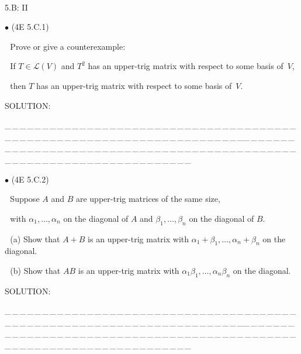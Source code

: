 \documentclass[a4paper, 11pt, UTF8]{article}
\def\Lm{\mathcal{L}}
\begin{document}
\begin{large}
\par{\tiny\,\par}

{\huge\timesbf 5.B: II}

{\small $\bullet$} (\normalsize{4E 5.C.1})\par\,\, {\timessl\Large 
Prove or give a counterexample:}\par\,\,
{\timessl\Large If $T\in \Lm(V)$ and $T^2$ has an upper-trig matrix with respect to some basis of \,$V$,}\par\,\,
{\timessl\Large then $T$ has an upper-trig matrix with respect to some basis of \,$V$.
}\par
{\timesbf S\footnotesize{OLUTION:}}\par\quad

\par
{\tiny \_\,\_\,\_\,\_\,\_\,\_\,\_\,\_\,\_\,\_\,\_\,\_\,\_\,\_\,\_\,\_\,\_\,\_\,\_\,\_\,\_\,\_\,\_\,\_\,\_\,\_\,\_\,\_\,\_\,\_\,\_\,\_\,\_\,\_\,\_\,\_\,\_\,\_\,\_\,\_\,\_\,\_\,\_\,\_\,\_\,\_\,\_\,\_\,\_\,\_\,\_\,\_\,\_\,\_\,\_\,\_\,\_\,\_\,\_\,\_\,\_\,\_\,\_\,\_\,\_\,\_\,\_\,\_\,\_\,\_\,\_\_\,\_\,\_\,\_\,\_\,\_\,\_\,\_\,\_\,\_\,\_\,\_\,\_\,\_\,\_\,\_\,\_\,\_\,\_\,\_\,\_\,\_\,\_\,\_\,\_\,\_\,\_\,\_\,\_\,\_\,\_\,\_\,\_\,\_\,\_\,\_\,\_\,\_\,\_\,\_\,\_\,\_\,\_\,\_\,\_\,\_\,\_\,\_\,\_\,\_\,\_\,\_\,\_\,\_\,\_\,\_\,\_\,\_\,\_\,\_\,\_\,\_\,\_\,\_\,\_\,\_\,\_\,\_\,\_\,\_\,\_}\par

{\small $\bullet$} (\normalsize{4E 5.C.2})\par\,\, {\timessl\Large 
Suppose $A$ and $B$ are upper-trig matrices of the same size,}\par\,\,
{\timessl\Large with $\alpha_1 , \dots , \alpha_n$ on the diagonal of $A$ and $\beta_1 , \dots , \beta_n$ on the diagonal of $B$.
}\par\,\,
(a) {\timessl\Large Show that $A + B$ is an upper-trig matrix with $\alpha_1 + \beta_1 , \dots , \alpha_n + \beta_n$ on the diagonal.
}\par\,\,
(b) {\timessl\Large Show that $AB$ is an upper-trig matrix with $\alpha_1 \beta_1 , \dots , \alpha_n \beta_n$ on the diagonal.
}\par
{\timesbf S\footnotesize{OLUTION:}}\par\quad

\par
{\tiny \_\,\_\,\_\,\_\,\_\,\_\,\_\,\_\,\_\,\_\,\_\,\_\,\_\,\_\,\_\,\_\,\_\,\_\,\_\,\_\,\_\,\_\,\_\,\_\,\_\,\_\,\_\,\_\,\_\,\_\,\_\,\_\,\_\,\_\,\_\,\_\,\_\,\_\,\_\,\_\,\_\,\_\,\_\,\_\,\_\,\_\,\_\,\_\,\_\,\_\,\_\,\_\,\_\,\_\,\_\,\_\,\_\,\_\,\_\,\_\,\_\,\_\,\_\,\_\,\_\,\_\,\_\,\_\,\_\,\_\,\_\_\,\_\,\_\,\_\,\_\,\_\,\_\,\_\,\_\,\_\,\_\,\_\,\_\,\_\,\_\,\_\,\_\,\_\,\_\,\_\,\_\,\_\,\_\,\_\,\_\,\_\,\_\,\_\,\_\,\_\,\_\,\_\,\_\,\_\,\_\,\_\,\_\,\_\,\_\,\_\,\_\,\_\,\_\,\_\,\_\,\_\,\_\,\_\,\_\,\_\,\_\,\_\,\_\,\_\,\_\,\_\,\_\,\_\,\_\,\_\,\_\,\_\,\_\,\_\,\_\,\_\,\_\,\_\,\_\,\_\,\_}\par


\end{large}
\end{document}
